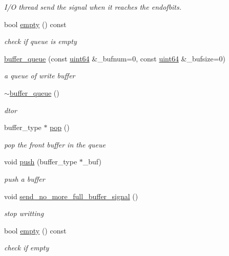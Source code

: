 \begin{DoxyCompactItemize}
\begin{DoxyCompactList}\small\item\em I/O thread send the signal when it reaches the endofbits. \end{DoxyCompactList}\item 
bool \hyperlink{structbuffer__queue_a5d618b9b6dd1f700db6f96182cc1ad15}{empty} () const
\begin{DoxyCompactList}\small\item\em check if queue is empty \end{DoxyCompactList}\item 
\hyperlink{structbuffer__queue_a4e972bf42989038b6ef7eda7a372d1c3}{buffer\+\_\+queue} (const \hyperlink{types_8h_a60e8696a4678cd348e991a1f172e53f7}{uint64} \&\+\_\+bufnum=0, const \hyperlink{types_8h_a60e8696a4678cd348e991a1f172e53f7}{uint64} \&\+\_\+bufsize=0)
\begin{DoxyCompactList}\small\item\em a queue of write buffer \end{DoxyCompactList}\item 
\hyperlink{structbuffer__queue_a8dda78874230bead5795e510f315dc2c}{$\sim$buffer\+\_\+queue} ()
\begin{DoxyCompactList}\small\item\em dtor \end{DoxyCompactList}\item 
buffer\+\_\+type $\ast$ \hyperlink{structbuffer__queue_ab26cbb480e9a300a4a021f4be1bb2735}{pop} ()
\begin{DoxyCompactList}\small\item\em pop the front buffer in the queue \end{DoxyCompactList}\item 
void \hyperlink{structbuffer__queue_a13c104db4054ca0cb59b5e0502267d55}{push} (buffer\+\_\+type $\ast$\+\_\+buf)
\begin{DoxyCompactList}\small\item\em push a buffer \end{DoxyCompactList}\item 
void \hyperlink{structbuffer__queue_a487335f8827c09d4d76d588e47d633ac}{send\+\_\+no\+\_\+more\+\_\+full\+\_\+buffer\+\_\+signal} ()
\begin{DoxyCompactList}\small\item\em stop writting \end{DoxyCompactList}\item 
bool \hyperlink{structbuffer__queue_a5d618b9b6dd1f700db6f96182cc1ad15}{empty} () const
\begin{DoxyCompactList}\small\item\em check if empty \end{DoxyCompactList}\end{DoxyCompactItemize}
